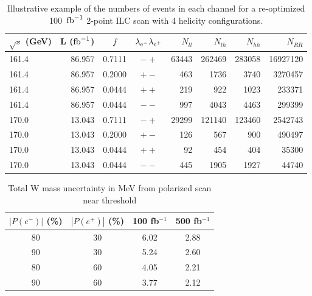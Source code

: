 \documentclass[12pt]{article}
\begin{document}
\begin{table}[!htb]
\begin{center}
\begin{tabular}{l|r|c|c|r|r|r|r}
    $\sqrt{s}$ (GeV) &   L ($\rm{fb}^{-1}$)   &  $f$  & $\lambda_{\rm{e}^{-}} \lambda_{\rm{e}^{+}} $   &   $N_{ll}$ & $N_{lh}$   & $N_{hh}$ & $N_
{RR}$ \\ \hline 
     161.4 &     86.957 &     0.7111  & $-+$   &   63443  &  262469  &  283058  &16927120 \\ 
     161.4 &     86.957 &     0.2000  & $+-$   &     463  &    1736  &    3740  & 3270457 \\ 
     161.4 &     86.957 &     0.0444  & $++$   &     219  &     922  &    1023  &  233371 \\ 
     161.4 &     86.957 &     0.0444  & $--$   &     997  &    4043  &    4463  &  299399 \\ \hline

     170.0 &     13.043 &     0.7111  & $-+$   &   29299  &  121140  &  123460  & 2542743 \\ 
     170.0 &     13.043 &     0.2000  & $+-$   &     126  &     567  &     900  &  490497 \\ 
     170.0 &     13.043 &     0.0444  & $++$   &      92  &     454  &     404  &   35300 \\ 
     170.0 &     13.043 &     0.0444  & $--$   &     445  &    1905  &    1927  &   44740 \\ \hline
\end{tabular}
\caption{Illustrative example of the numbers of events in each channel for a re-optimized 
100~$\rm{fb}^{-1}$ 2-point ILC scan with 4 helicity configurations.}
\label{tab:illustrate2}
\end{center}
\end{table} 


\begin{table}[!htb]
\begin{center}
\begin{tabular}{c|c|c|c}
$|P(e^{-})|$ (\%) & $|P(e^{+})|$ (\%) & 100 fb$^{-1}$ & 500 fb$^{-1}$ \\ \hline
     80      &        30    &  6.02    &    2.88   \\
     90      &        30    &  5.24    &    2.60   \\
     80      &        60    &  4.05    &    2.21   \\
     90      &        60    &  3.77    &    2.12   \\ \hline
\end{tabular}
\caption{Total W mass uncertainty in MeV from polarized scan near threshold}
\label{tab:Prospects}
\end{center}
\end{table}
\end{document}
